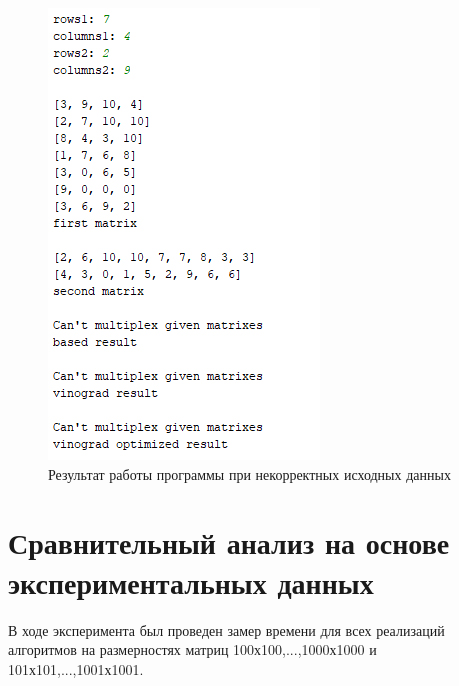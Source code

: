 \documentclass[a4paper,12pt]{report}
\begin{document}
        \newpage
        
        \begin{figure}[h!]
        	\centering
        	\includegraphics[width=0.7\linewidth]{test_mult2.jpg}
        	\caption{Результат работы программы при некорректных исходных данных}
        	\label{ris:work2}
    	\end{figure}
        
        \newpage
        
    \section{Сравнительный анализ на основе экспериментальных данных}

        	В ходе эксперимента был проведен замер времени для всех реализаций алгоритмов на размерностях матриц 100х100,...,1000х1000 и 101х101,...,1001х1001.
        
\end{document}
